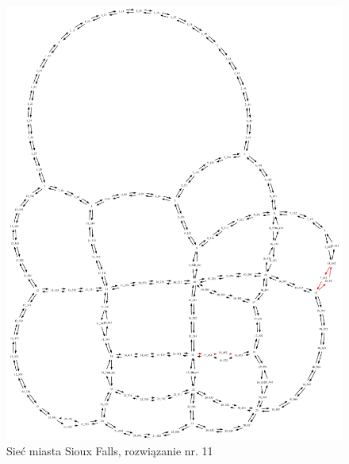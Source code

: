 \documentclass[twoside,12pt]{report}
\begin{document}
\begin{figure}[ht]
\centering
\includegraphics[totalheight=0.580\textheight, angle=90]{img/sioux-out/11/network2}
\caption{Sieć miasta Sioux Falls, rozwiązanie nr. 11}
\label{sioux11}
\end{figure}
\end{document}
